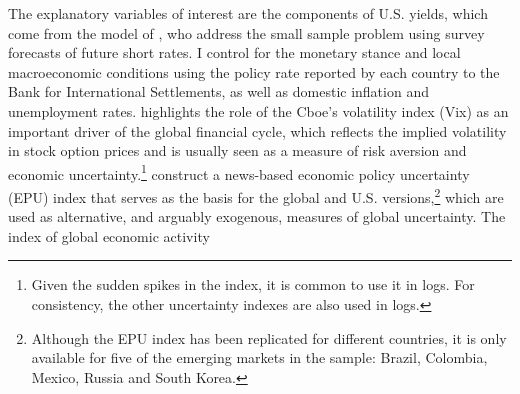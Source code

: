 {%
The explanatory variables of interest are the components of U.S. yields, which come from %
the model of \cite{KimWright:2005}, who %
address the small sample problem using survey forecasts of future short rates.
I control for the monetary stance and local macroeconomic conditions using the policy rate reported by each country to the Bank for International Settlements, as well as domestic inflation and unemployment rates. %
\cite{Rey:2013} highlights the role of the Cboe's volatility index (Vix) as an important driver of the global financial cycle,
which reflects the implied volatility in stock option prices and is usually seen as a measure of risk aversion and economic uncertainty.\footnote{ Given the sudden spikes in the index, it is common to use it in logs. For consistency, the other uncertainty indexes are also used in logs.}
\cite{BakerBloomDavis:2016} construct a news-based economic policy uncertainty (EPU) index that serves as the basis for the global and U.S. versions,\footnote{ Although the EPU index has been replicated for different countries, it is only available for five of the emerging markets in the sample: Brazil, Colombia, Mexico, Russia and South Korea.} %
which are used as alternative, and arguably exogenous, measures of global uncertainty.
The index of global economic activity %
}
